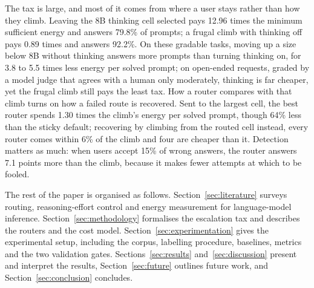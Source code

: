 The tax is large, and most of it comes from where a user stays rather than
how they climb. Leaving the 8B thinking cell selected pays 12.96 times the
minimum sufficient energy and answers 79.8\% of prompts; a frugal climb with
thinking off pays 0.89 times and answers 92.2\%. On these gradable tasks,
moving up a size below 8B without thinking answers more prompts than turning
thinking on, for 3.8 to 5.5 times less energy per solved prompt; on
open-ended requests, graded by a model judge that agrees with a human only
moderately, thinking is far cheaper, yet the frugal climb still pays the
least tax. How a router compares with that climb turns on how a failed route
is recovered. Sent to the largest cell, the best router spends 1.30 times
the climb's energy per solved prompt, though 64\% less than the sticky
default; recovering by climbing from the routed cell instead, every router
comes within 6\% of the climb and four are cheaper than it. Detection
matters as much: when users accept 15\% of wrong answers, the router answers
7.1 points more than the climb, because it makes fewer attempts at which to
be fooled.

The rest of the paper is organised as follows. Section~\ref{sec:literature}
surveys routing, reasoning-effort control and energy measurement for
language-model inference. Section~\ref{sec:methodology} formalises the
escalation tax and describes the routers and the cost model.
Section~\ref{sec:experimentation} gives the experimental setup, including
the corpus, labelling procedure, baselines, metrics and the two validation
gates. Sections~\ref{sec:results} and~\ref{sec:discussion} present and
interpret the results, Section~\ref{sec:future} outlines future work, and
Section~\ref{sec:conclusion} concludes.
